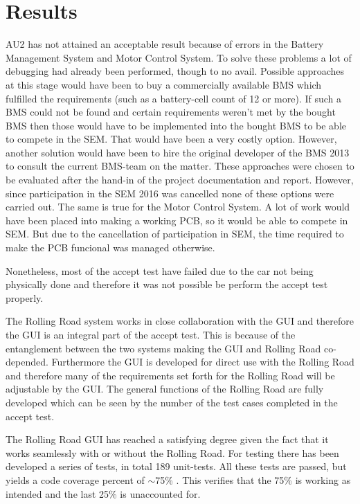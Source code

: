 \chapter{Results}
AU2 has not attained an acceptable result because of errors in the Battery Management System and Motor Control System. To solve these problems a lot of debugging had already been performed, though to no avail. Possible approaches at this stage would have been to buy a commercially available BMS which fulfilled the requirements (such as a battery-cell count of 12 or more). If such a BMS could not be found and certain requirements weren't met by the bought BMS then those would have to be implemented into the bought BMS to be able to compete in the SEM. That would have been a very costly option. However, another solution would have been to hire the original developer of the BMS 2013 to consult the current BMS-team on the matter. These approaches were chosen to be evaluated after the hand-in of the project documentation and report. However, since participation in the SEM 2016 was cancelled none of these options were carried out.
The same is true for the Motor Control System. A lot of work would have been placed into making a working PCB, so it would be able to compete in SEM. But due to the cancellation of participation in SEM, the time required to make the PCB funcional was managed otherwise.

Nonetheless, most of the accept test have failed due to the car not being physically done and therefore it was not possible be perform the accept test properly.

The Rolling Road system works in close collaboration with the GUI and therefore the GUI is an integral part of the accept test. This is because of the entanglement between the two systems making the GUI and Rolling Road co-depended. Furthermore the GUI is developed for direct use with the Rolling Road and therefore many of the requirements set forth for the Rolling Road will be adjustable by the GUI. The general functions of the Rolling Road are fully developed which can be seen by the number of the test cases completed in the accept test.

The Rolling Road GUI has reached a satisfying degree given the fact that it works seamlessly with or without the Rolling Road. For testing there has been developed a series of tests, in total 189 unit-tests. All these tests are passed, but yields a code coverage percent of $\sim$75\% . This verifies that the 75\% is working as intended and the last 25\% is unaccounted for.

